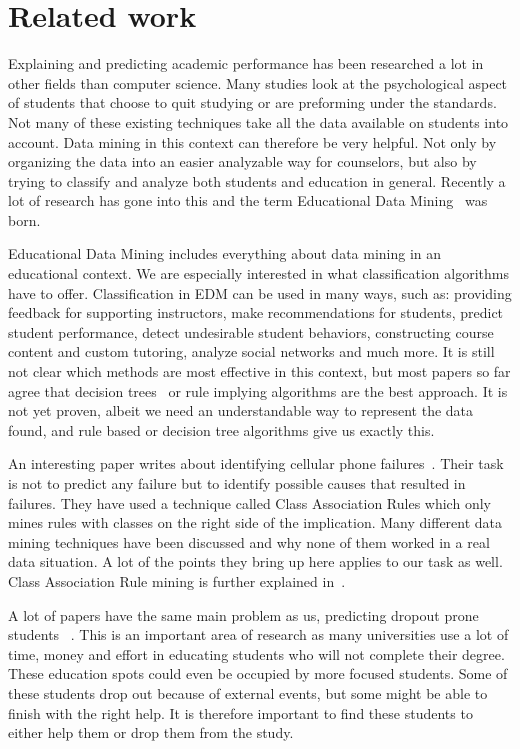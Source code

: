 \chapter{Related work}\label{ch:related}
Explaining and predicting academic performance has been researched a lot in other fields than computer science. Many studies look at the psychological aspect of students that choose to quit studying or are preforming under the standards. Not many of these existing techniques take all the data available on students into account. Data mining in this context can therefore be very helpful. Not only by organizing the data into an easier analyzable way for counselors, but also by trying to classify and analyze both students and education in general. Recently a lot of research has gone into this and the term Educational Data Mining~\cite{1} was born.

\bigskip\noindent
Educational Data Mining includes everything about data mining in an educational context.
We are especially interested in what classification algorithms have to offer. 
Classification in EDM can be used in many ways, such as:
providing feedback for supporting instructors,
make recommendations for students,
predict student performance,
detect undesirable student behaviors,
constructing course content and custom tutoring,
analyze social networks and much more.
It is still not clear which methods are most effective in this context, but most papers so far agree that decision trees~\cite{2,12} or rule implying algorithms are the best approach.
It is not yet proven, albeit we need an understandable way to represent the data found, and rule based or decision tree algorithms give us exactly this. 

\bigskip\noindent
An interesting paper writes about identifying cellular phone failures~\cite{3}.
Their task is not to predict any failure but to identify possible causes that resulted in failures.  
They have used a technique called Class Association Rules which only mines rules with classes on the right side of the implication. 
Many different data mining techniques have been discussed and why none of them worked in a real data situation. 
A lot of the points they bring up here applies to our task as well.
Class Association Rule mining is further explained in~\cite{4}.

\bigskip\noindent
A lot of papers have the same main problem as us, predicting dropout prone students~\cite{5,7,8,9,11} .
This is an important area of research as many universities use a lot of time, 
money and effort in educating students who will not complete their degree. 
These education spots could even be occupied by more focused students. 
Some of these students drop out because of external events, but some might be able to finish with the right help. 
It is therefore important to find these students to either help them or drop them from the study. 

